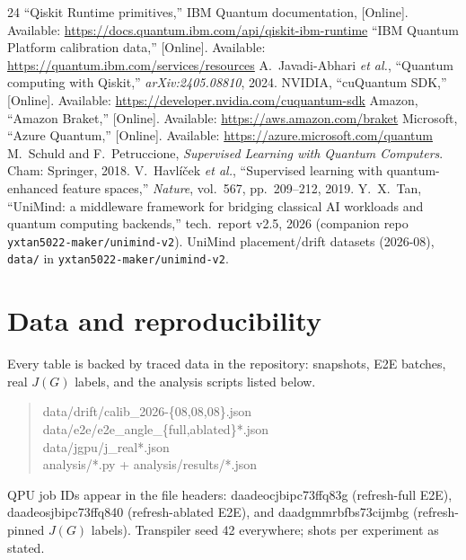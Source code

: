 \documentclass[journal,10pt,twocolumn]{IEEEtran}
\begin{document}
\begin{thebibliography}{24}
 ``Qiskit Runtime primitives,'' IBM Quantum documentation, [Online]. Available: \url{https://docs.quantum.ibm.com/api/qiskit-ibm-runtime}
 ``IBM Quantum Platform calibration data,'' [Online]. Available: \url{https://quantum.ibm.com/services/resources}
 A.~Javadi-Abhari \emph{et al.}, ``Quantum computing with Qiskit,'' \emph{arXiv:2405.08810}, 2024.
 NVIDIA, ``cuQuantum SDK,'' [Online]. Available: \url{https://developer.nvidia.com/cuquantum-sdk}
 Amazon, ``Amazon Braket,'' [Online]. Available: \url{https://aws.amazon.com/braket}
 Microsoft, ``Azure Quantum,'' [Online]. Available: \url{https://azure.microsoft.com/quantum}
 M.~Schuld and F.~Petruccione, \emph{Supervised Learning with Quantum Computers}. Cham: Springer, 2018.
 V.~Havl\'i\v{c}ek \emph{et al.}, ``Supervised learning with quantum-enhanced feature spaces,'' \emph{Nature}, vol.~567, pp.~209--212, 2019.
 Y.~X.~Tan, ``UniMind: a middleware framework for bridging classical AI workloads and quantum computing backends,'' tech.\ report v2.5, 2026 (companion repo \texttt{yxtan5022-maker/unimind-v2}).
 UniMind placement/drift datasets (2026-08), \texttt{data/} in \texttt{yxtan5022-maker/unimind-v2}.
\end{thebibliography}

\section*{Data and reproducibility}
\label{sec:data}
Every table is backed by traced data in the repository: snapshots, E2E batches, real $J(G)$ labels, and the
analysis scripts listed below.
\begin{quote}\small\raggedright\ttfamily
data/drift/calib\_2026-\{08,08,08\}.json\\
data/e2e/e2e\_angle\_\{full,ab\-lated\}*.json\\
data/jgpu/j\_real*.json\\
analysis/*.py + analysis/results/*.json
\end{quote}
QPU job IDs appear in the file headers:
{\small\ttfamily daadeocjbipc73ffq83g} (refresh-full E2E),
{\small\ttfamily daadeosjbipc73ffq840} (refresh-ablated E2E), and
{\small\ttfamily daadgmmrbfbs73cijmbg} (refresh-pinned $J(G)$ labels).
Transpiler seed 42 everywhere; shots per experiment as stated.
\end{document}
